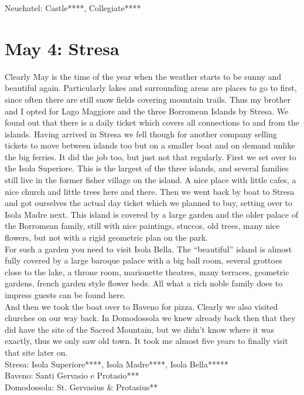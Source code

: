 Neuchatel: Castle****, Collegiate****

\section{May 4: Stresa}
\label{Stresa2014}

Clearly May is the time of the year when the weather starts to be sunny and beautiful again. Particularly lakes and surrounding areas are places to go to first, since often there are still snow fields covering mountain trails. Thus my brother and I opted for Lago Maggiore and the three Borromean Islands by Stresa. We found out that there is a daily ticket which covers all connections to and from the islands. Having arrived in Stresa we fell though for another company selling tickets to move between islands too but on a smaller boat and on demand unlike the big ferries. It did the job too, but just not that regularly. First we set over to the Isola Superiore. This is the largest of the three islands, and several families still live in the former fisher village on the island. A nice place with little cafes, a nice church and little trees here and there. Then we went back by boat to Stresa and got ourselves the actual day ticket which we planned to buy, setting over to Isola Madre next. This island is covered by a large garden and the older palace of the Borromean family, still with nice paintings, stuccos, old trees, many nice flowers, but not with a rigid geometric plan on the park.\\
For such a garden you need to visit Isola Bella. The ``beautiful'' island is almost fully covered by a large baroque palace with a big ball room, several grottoes close to the lake, a throne room, marionette theatres, many terraces, geometric gardens, french garden style flower beds. All what a rich noble family does to impress guests can be found here.\\
And then we took the boat over to Baveno for pizza. Clearly we also visited churches on our way back. In Domodossola we knew already back then that they did have the site of the Sacred Mountain, but we didn't know where it was exactly, thus we only saw old town. It took me almost five years to finally visit that site later on.\\

Stresa: Isola Superiore****, Isola Madre****, Isola Bella*****\\
Baveno: Santi Gervasio e Protasio***\\
Domodossola:  St. Gervasius \& Protasius**

